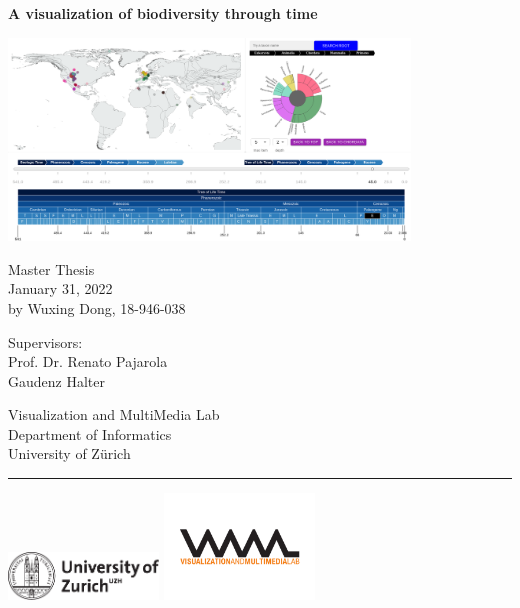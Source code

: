 \documentclass[11pt, a4paper,oneside,chapterprefix=false]{scrbook}
\begin{document}
\frontmatter
\begin{titlepage}
	\setlength{\parindent}{0cm}
	\addtolength{\textheight}{1.0cm}

	\vspace{0.5cm}
	\Huge
	{\textbf{A visualization of biodiversity through time\\ }}

	\vfill \vfill \vfill
	\begin{center}
	\includegraphics*[width=0.8\textwidth]{figures/cover/cover}
    \end{center}
	\vfill
	\sf \Large
	Master Thesis \\
	January 31, 2022 \\[0.5cm]
	\large
	by Wuxing Dong, 18-946-038

	\vfill \vfill \vfill
	\begin{minipage}[b]{0.5\textwidth}
	Supervisors: \\
	Prof. Dr. Renato Pajarola \\
	Gaudenz Halter \\
	\end{minipage}
	\begin{minipage}[b]{0.5\textwidth} \raggedleft
	Visualization and MultiMedia Lab \\
	Department of Informatics \\
	University of Z{\"u}rich
	\end{minipage}

	\vfill
	\hrule
	\vspace{0.5cm}
	\includegraphics*[width=0.3\textwidth]{figures/cover/uzh_logo} \hfill
	\includegraphics*[width=0.3\textwidth]{figures/cover/vmml_logo}
\end{titlepage}
\end{document}
